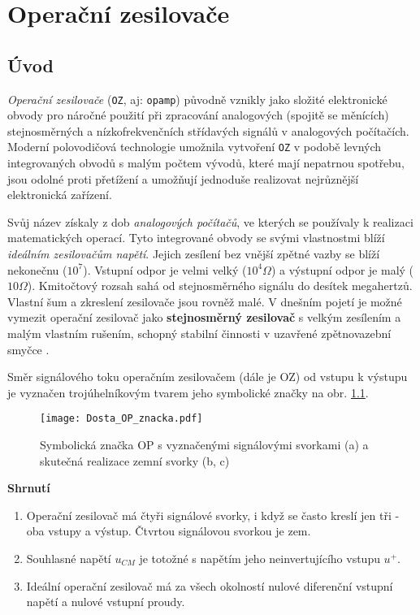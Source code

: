 \chapter{Operační zesilovače}
\minitoc
\newpage
  \section{Úvod}
    \emph{Operační zesilovače} (\texttt{OZ}, aj: \texttt{opamp}) původně vznikly jako složité 
    elektronické obvody pro náročné použití při zpracování analogových (spojitě se měnících) 
    stejnosměrných a nízkofrekvenčních střídavých signálů v analogových počítačích. Moderní 
    polovodičová technologie umožnila vytvoření \texttt{OZ} v podobě levných integrovaných obvodů s 
    malým počtem vývodů, které mají nepatrnou spotřebu, jsou odolné proti přetížení a umožňují 
    jednoduše realizovat nejrůznější elektronická zařízení.
  
    Svůj název získaly z dob \emph{analogových počítačů}, ve kterých se používaly k realizaci 
    matematických operací. Tyto integrované obvody se svými vlastnostmi blíží \emph{ideálním 
    zesilovačům napětí}. Jejich zesílení bez vnější zpětné vazby se blíží nekonečnu ($10^7$). 
    Vstupní odpor je velmi velký ($10^4 \Omega$) a výstupní odpor je malý ($10 \Omega$). Kmitočtový 
    rozsah sahá od stejnosměrného signálu do desítek megahertzů. Vlastní šum a zkreslení zesilovače 
    jsou rovněž malé. V dnešním pojetí je možné vymezit operační zesilovač jako \textbf{stejnosměrný 
    zesilovač} s velkým zesílením a malým vlastním rušením, schopný stabilní činnosti v uzavřené 
    zpětnovazební smyčce \cite[s.~5]{Dostal}.

    Směr signálového toku operačním zesilovačem (dále je OZ) od vstupu k výstupu je vyznačen 
    trojúhelníkovým tvarem jeho symbolické značky na obr. \ref{AES:OP_znacka}.
    \begin{figure}[ht!]
      \centering
      \texttt{[image: Dosta\_OP\_znacka.pdf]}
      \caption[Symbolická značka OP]{Symbolická značka OP s vyznačenými signálovými svorkami (a) a skutečná
               realizace zemní svorky (b, c)}
      \label{AES:OP_znacka}
    \end{figure}
  
    \textbf{Shrnutí}
    \begin{enumerate}
      \item Operační zesilovač má čtyři signálové svorky, i když se často kreslí jen tři - oba 
            vstupy a výstup. Čtvrtou signálovou svorkou je zem.
      \item Souhlasné napětí $u_{CM}$ je totožné s napětím jeho neinvertujícího vstupu $u^+$.
      \item Ideální operační zesilovač má za všech okolností nulové diferenční vstupní napětí a nulové  
            vstupní proudy.
    \end{enumerate}
  
